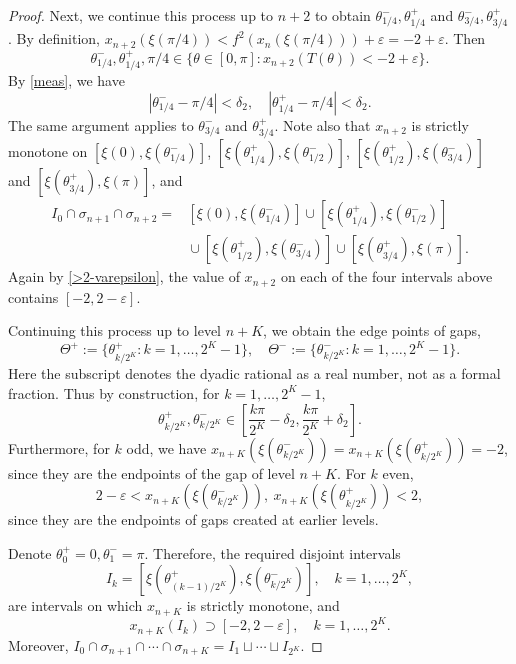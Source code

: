 \documentclass{amsart}
\theoremstyle{definition}
\begin{document}
\begin{proof}
Next, we continue this process up to $n+2$ to obtain 
$\theta^{-}_{1/4}, \theta^{+}_{1/4}$ and $\theta^{-}_{3/4}, \theta^{+}_{3/4}$.
By definition,
 $x_{n+2}(\xi(\pi/4))<f^2(x_n(\xi(\pi/4)))+\varepsilon=-2+\varepsilon$.
 Then
 \begin{equation*}
  \theta^{-}_{1/4}, \theta^{+}_{1/4},\pi/4\in  \{\theta\in[0,\pi]:x_{n+2}(T(\theta))<-2+\varepsilon\}.
\end{equation*}
By \eqref{meas}, we have
\begin{equation*}
|\theta^{-}_{1/4}-\pi/4|<\delta_2, \quad |\theta^{+}_{1/4}-\pi/4|<\delta_2.
\end{equation*}
The same argument applies to $\theta^{-}_{3/4}$ and $\theta^{+}_{3/4}$.
Note also that $x_{n+2}$ is strictly monotone on $[\xi(0),\xi(\theta^{-}_{1/4})]$,
$[\xi(\theta^{+}_{1/4}),\xi(\theta^{-}_{1/2})]$,
$[\xi(\theta^{+}_{1/2}),\xi(\theta^{-}_{3/4})]$ and $[\xi(\theta^{+}_{3/4}),\xi(\pi)]$,
and
\begin{equation*}
\begin{aligned}
I_0\cap\sigma_{n+1}\cap\sigma_{n+2}
={}&[\xi(0),\xi(\theta^-_{1/4})]
   \cup[\xi(\theta^+_{1/4}),\xi(\theta^-_{1/2})]\\
 &{}\cup[\xi(\theta^+_{1/2}),\xi(\theta^-_{3/4})]
   \cup[\xi(\theta^+_{3/4}),\xi(\pi)].
\end{aligned}
\end{equation*}
Again by \eqref{>2-varepsilon}, the value of $x_{n+2}$ on
 each of the four intervals above contains $[-2,2-\varepsilon]$.

 Continuing this process up to level $n+K$,
 we obtain the edge points of gaps,
 \begin{equation*}
    \Theta^{+}:=\{\theta^{+}_{k/2^K}:k=1,\ldots,2^K-1\},\quad
    \Theta^{-}:=\{\theta^{-}_{k/2^K}:k=1,\ldots,2^K-1\}.
 \end{equation*}
 Here the subscript denotes the dyadic rational as a real number, not as a formal fraction.
Thus by construction, for $k=1,\ldots,2^K-1$,
\begin{equation*}
\theta^{+}_{k/2^K},\theta^{-}_{k/2^K}\in [\frac{k\pi}{2^K}-\delta_2,\frac{k\pi}{2^K}+\delta_2].
\end{equation*}
Furthermore, for $k$ odd, we have
$x_{n+K}(\xi(\theta^{-}_{k/2^K}))=x_{n+K}(\xi(\theta^{+}_{k/2^K}))=-2$,
since they are the endpoints of the gap of level $n+K$.
For $k$ even, 
$$2-\varepsilon<x_{n+K}(\xi(\theta^{-}_{k/2^K})),\ 
x_{n+K}(\xi(\theta^{+}_{k/2^K}))<2,$$ 
since they are the endpoints of gaps created at earlier levels.

Denote $\theta^{+}_{0}=0,\theta^{-}_{1}=\pi$.
Therefore, the required disjoint intervals
\begin{equation*}
    I_k=[\xi(\theta^{+}_{(k-1)/2^K}),\xi(\theta^{-}_{k/2^K})],\quad k=1,\ldots,2^K,
\end{equation*}
are intervals on which $x_{n+K}$ is strictly monotone, and
\begin{equation*}
x_{n+K}(I_k)\supset [-2,2-\varepsilon],\quad k=1,\ldots,2^K.
\end{equation*}
Moreover, $ I_0\cap\sigma_{n+1}\cap\cdots\cap\sigma_{n+K}
=I_1\sqcup\cdots\sqcup I_{2^K}$.
\end{proof}
\end{document}
